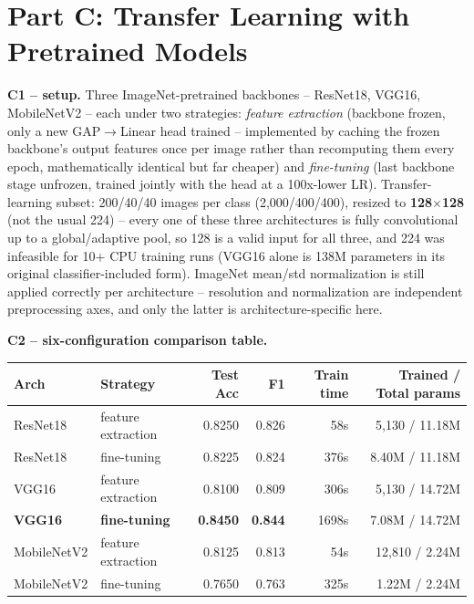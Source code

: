 \documentclass[11pt,a4paper]{article}
\begin{document}
\section*{Part C: Transfer Learning with Pretrained Models}

\textbf{C1 -- setup.} Three ImageNet-pretrained backbones -- ResNet18, VGG16, MobileNetV2 --
each under two strategies: \emph{feature extraction} (backbone frozen, only a new
GAP$\to$Linear head trained -- implemented by caching the frozen backbone's output features
once per image rather than recomputing them every epoch, mathematically identical but far
cheaper) and \emph{fine-tuning} (last backbone stage unfrozen, trained jointly with the head
at a 100x-lower LR). Transfer-learning subset: 200/40/40 images per class (2{,}000/400/400),
resized to \textbf{128$\times$128} (not the usual 224) -- every one of these three
architectures is fully convolutional up to a global/adaptive pool, so 128 is a valid input
for all three, and 224 was infeasible for 10+ CPU training runs (VGG16 alone is 138M
parameters in its original classifier-included form). ImageNet mean/std normalization is
still applied correctly per architecture -- resolution and normalization are independent
preprocessing axes, and only the latter is architecture-specific here.

\textbf{C2 -- six-configuration comparison table.}

\begin{table}[H]
\centering
\small
\begin{tabular}{llrrrr}
\toprule
\textbf{Arch} & \textbf{Strategy} & \textbf{Test Acc} & \textbf{F1} & \textbf{Train time} & \textbf{Trained / Total params} \\
\midrule
ResNet18 & feature extraction & 0.8250 & 0.826 & 58s & 5{,}130 / 11.18M \\
ResNet18 & fine-tuning & 0.8225 & 0.824 & 376s & 8.40M / 11.18M \\
VGG16 & feature extraction & 0.8100 & 0.809 & 306s & 5{,}130 / 14.72M \\
\textbf{VGG16} & \textbf{fine-tuning} & \textbf{0.8450} & \textbf{0.844} & 1698s & 7.08M / 14.72M \\
MobileNetV2 & feature extraction & 0.8125 & 0.813 & 54s & 12{,}810 / 2.24M \\
MobileNetV2 & fine-tuning & 0.7650 & 0.763 & 325s & 1.22M / 2.24M \\
\bottomrule
\end{tabular}
\end{table}
\end{document}
